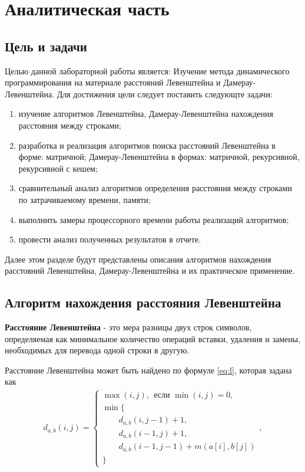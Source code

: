 \chapter{Аналитическая часть}
\section{Цель и задачи}
Целью данной лабораторной работы является: Изучение метода динамического программирования на материале расстояний Левенштейна и Дамерау-Левенштейна.
Для достижения цели следует поставить следующте задачи: 
\begin{enumerate}
	\item изучение алгоритмов Левенштейна, Дамерау-Левенштейна нахождения расстояния между строками;
	\item разработка и реализация алгоритмов поиска расстояний Левенштейна в форме: матричной; Дамерау-Левенштейна в формах: матричной, рекурсивной, рекурсивной с кешем;
	\item сравнительный анализ алгоритмов определения расстояния между строками по затрачиваемому времени, памяти;
	\item выполнить замеры процессорного времени работы реализаций алгоритмов; 
	\item провести анализ полученных результатов в отчете.
\end{enumerate}

Далее этом разделе будут представлены описания алгоритмов нахождения расстояний Левенштейна, Дамерау-Левенштейна и их практическое применение.
\section{Алгоритм нахождения расстояния Левенштейна}

\textbf{Расстояние Левенштейна} - это мера разницы двух строк символов, определяемая как минимальное количество операций вставки, удаления и замены, необходимых для перевода одной строки в другую.

Расстояние Левенштейна может быть найдено по формуле \ref{eq:l}, которая задана как
\begin{equation}
	\label{eq:l}
	\begin{aligned}
		d_{a,b}(i, j) = \begin{cases}
			\max(i, j), ~~\text{если }\min(i, j) = 0,\\
			\min \lbrace \\
			\qquad d_{a,b}(i, j-1) + 1,\\
			\qquad d_{a,b}(i-1, j) + 1,\\
			\qquad d_{a,b}(i-1, j-1) + m(a[i], b[j])\\
			\rbrace
		\end{cases},
	\end{aligned}
\end{equation}


